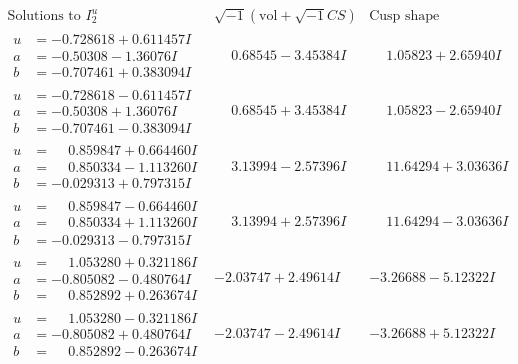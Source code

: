 \documentclass[1p]{elsarticle_modified}
\theoremstyle{definition}
\newcommand{\I}{\sqrt{-1}}
\begin{document}
$$\begin{array}{c|c|c}  
\text{Solutions to }I^u_{2}& \I (\text{vol} + \sqrt{-1}CS) & \text{Cusp shape}\\
 \hline 
\begin{aligned}
u &= -0.728618 + 0.611457 I \\
a &= -0.50308 - 1.36076 I \\
b &= -0.707461 + 0.383094 I\end{aligned}
 & \phantom{-}0.68545 - 3.45384 I & \phantom{-}1.05823 + 2.65940 I \\ \hline\begin{aligned}
u &= -0.728618 - 0.611457 I \\
a &= -0.50308 + 1.36076 I \\
b &= -0.707461 - 0.383094 I\end{aligned}
 & \phantom{-}0.68545 + 3.45384 I & \phantom{-}1.05823 - 2.65940 I \\ \hline\begin{aligned}
u &= \phantom{-}0.859847 + 0.664460 I \\
a &= \phantom{-}0.850334 - 1.113260 I \\
b &= -0.029313 + 0.797315 I\end{aligned}
 & \phantom{-}3.13994 - 2.57396 I & \phantom{-}11.64294 + 3.03636 I \\ \hline\begin{aligned}
u &= \phantom{-}0.859847 - 0.664460 I \\
a &= \phantom{-}0.850334 + 1.113260 I \\
b &= -0.029313 - 0.797315 I\end{aligned}
 & \phantom{-}3.13994 + 2.57396 I & \phantom{-}11.64294 - 3.03636 I \\ \hline\begin{aligned}
u &= \phantom{-}1.053280 + 0.321186 I \\
a &= -0.805082 - 0.480764 I \\
b &= \phantom{-}0.852892 + 0.263674 I\end{aligned}
 & -2.03747 + 2.49614 I & -3.26688 - 5.12322 I \\ \hline\begin{aligned}
u &= \phantom{-}1.053280 - 0.321186 I \\
a &= -0.805082 + 0.480764 I \\
b &= \phantom{-}0.852892 - 0.263674 I\end{aligned}
 & -2.03747 - 2.49614 I & -3.26688 + 5.12322 I \\ \hline\begin{aligned}

\end{aligned}
\end{array}$$
\end{document}
